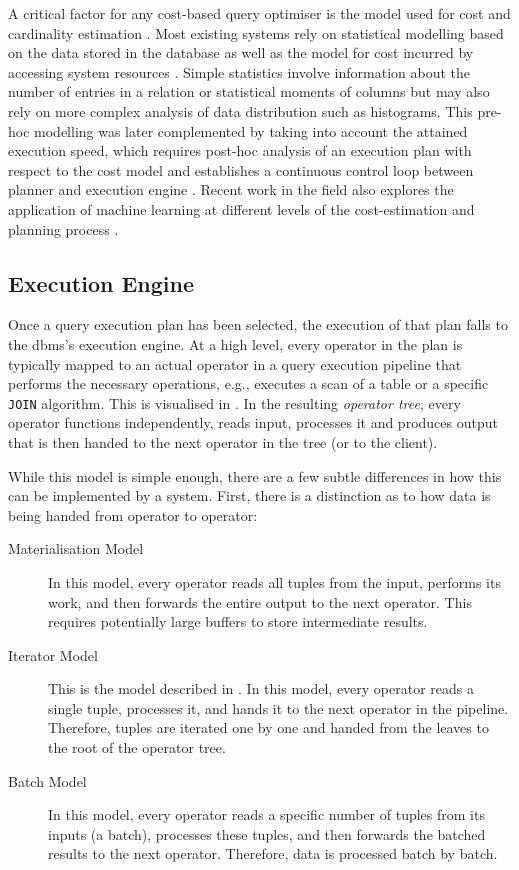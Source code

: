 A critical factor for any cost-based query optimiser is the model used for cost and cardinality estimation \cite{Jarke:1984Query,Yin:2015Robust}. Most existing systems rely on statistical modelling based on the data stored in the database \cite{Getoor:2001Selectivity,Ioannidis:2003History} as well as the model for cost incurred by accessing system resources \cite{Manegold:2002Generic}. Simple statistics involve information about the number of entries in a relation or statistical moments of columns but may also rely on more complex analysis of data distribution such as histograms. This pre-hoc modelling was later complemented by taking into account the attained execution speed, which requires post-hoc analysis of an execution plan with respect to the cost model and establishes a continuous control loop between planner and execution engine \cite{Mackert:1986R}. Recent work in the field also explores the application of machine learning at different levels of the cost-estimation and planning process \cite{Wu:2013Predicting,Vu:2019Deep,Abadi:2020Seattle}.

\subsection{Execution Engine}

Once a query execution plan has been selected, the execution of that plan falls to the \acrshort{dbms}'s execution engine. At a high level, every operator in the plan is typically mapped to an actual operator in a query execution pipeline that performs the necessary operations, e.g., executes a scan of a table or a specific \texttt{JOIN} algorithm. This is visualised in . In the resulting \emph{operator tree}, every operator functions independently, reads input, processes it and produces output that is then handed to the next operator in the tree (or to the client).

While this model is simple enough, there are a few subtle differences in how this can be implemented by a system. First, there is a distinction as to how data is being handed from operator to operator:

\begin{description}
    \item[Materialisation Model] In this model, every operator reads all tuples from the input, performs its work, and then forwards the entire output to the next operator. This requires potentially large buffers to store intermediate results.
    \item[Iterator Model] This is the model described in \cite{Graefe:1993Volcano,Graefe:1993Query}. In this model, every operator reads a single tuple, processes it, and hands it to the next operator in the pipeline. Therefore, tuples are iterated one by one and handed from the leaves to the root of the operator tree.
    \item[Batch Model] In this model, every operator reads a specific number of tuples from its inputs (a batch), processes these tuples, and then forwards the batched results to the next operator. Therefore, data is processed batch by batch.
\end{description}

